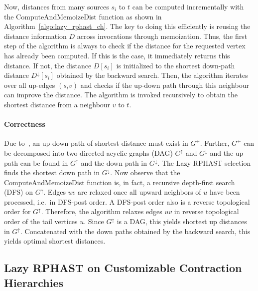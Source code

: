 \documentclass[manuscript]{acmart}
\newcommand*{\gchu}{G^{\uparrow}}
\newcommand*{\gchd}{G^{\downarrow}}
\begin{document}
Now, distances from many sources $s_i$ to $t$ can be computed incrementally with the \textsf{ComputeAndMemoizeDist} function as shown in Algorithm~\ref{algo:lazy_rphast_ch}.
The key to doing this efficiently is reusing the distance information $D$ across invocations through memoization.
Thus, the first step of the algorithm is always to check if the distance for the requested vertex has already been computed.
If this is the case, it immediately returns this distance.
If not, the distance $D[s_i]$ is initialized to the shortest down-path distance $D^{\downarrow}[s_i]$ obtained by the backward search.
Then, the algorithm iterates over all up-edges $(s_i v)$ and checks if the up-down path through this neighbour can improve the distance.
The algorithm is invoked recursively to obtain the shortest distance from a neighbour $v$ to $t$.

\paragraph{Correctness}
Due to~\cite{gssv-erlrn-12}, an up-down path of shortest distance must exist in $G^+$.
Further, $G^+$ can be decomposed into two directed acyclic graphs (DAG) $\gchu$ and $\gchd$ and the up path can be found in $\gchu$ and the down path in $\gchd$.
The Lazy RPHAST selection finds the shortest down path in $\gchd$.
Now observe that the \textsf{ComputeAndMemoizeDist} function is, in fact, a recursive depth-first search (DFS) on $\gchu$.
Edges $uv$ are relaxed once all upward neighbors of $u$ have been processed, i.e.\ in DFS-post order.
A DFS-post order also is a reverse topological order for $\gchu$.
Therefore, the algorithm relaxes edges $uv$ in reverse topological order of the tail vertices $u$.
Since $\gchu$ is a DAG, this yields shortest up distances in $\gchu$.
Concatenated with the down paths obtained by the backward search, this yields optimal shortest distances.

\subsection{Lazy RPHAST on Customizable Contraction Hierarchies}
\end{document}

